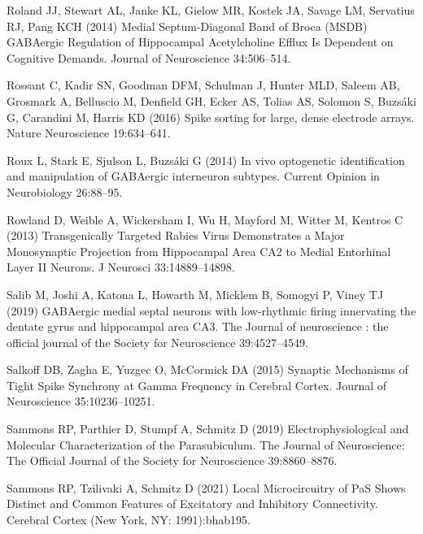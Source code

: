\documentclass[
  12pt,
  a4paper,
  openany]{book}
\newlength{\cslhangindent}
\newlength{\cslentryspacingunit} %
\newenvironment{CSLReferences}[2] %
 {%
  \setlength{\parindent}{0pt}
  \ifodd #1
  \let\oldpar\par
  \def\par{\hangindent=\cslhangindent\oldpar}
  \fi
  \setlength{\parskip}{#2\cslentryspacingunit}
 }%
 {}
\begin{document}
\begin{CSLReferences}{1}{0}
\leavevmode{}%
Roland JJ, Stewart AL, Janke KL, Gielow MR, Kostek JA, Savage LM, Servatius RJ, Pang KCH (2014) Medial {Septum}-{Diagonal} {Band} of {Broca} ({MSDB}) {GABAergic} {Regulation} of {Hippocampal} {Acetylcholine} {Efflux} {Is} {Dependent} on {Cognitive} {Demands}. Journal of Neuroscience 34:506--514.

\leavevmode{}%
Rossant C, Kadir SN, Goodman DFM, Schulman J, Hunter MLD, Saleem AB, Grosmark A, Belluscio M, Denfield GH, Ecker AS, Tolias AS, Solomon S, Buzsáki G, Carandini M, Harris KD (2016) Spike sorting for large, dense electrode arrays. Nature Neuroscience 19:634--641.

\leavevmode{}%
Roux L, Stark E, Sjulson L, Buzsáki G (2014) In vivo optogenetic identification and manipulation of {GABAergic} interneuron subtypes. Current Opinion in Neurobiology 26:88--95.

\leavevmode{}%
Rowland D, Weible A, Wickersham I, Wu H, Mayford M, Witter M, Kentros C (2013) Transgenically {Targeted} {Rabies} {Virus} {Demonstrates} a {Major} {Monosynaptic} {Projection} from {Hippocampal} {Area} {CA2} to {Medial} {Entorhinal} {Layer} {II} {Neurons}. J Neurosci 33:14889--14898.

\leavevmode{}%
Salib M, Joshi A, Katona L, Howarth M, Micklem B, Somogyi P, Viney TJ (2019) {GABAergic} medial septal neurons with low-rhythmic firing innervating the dentate gyrus and hippocampal area {CA3}. The Journal of neuroscience : the official journal of the Society for Neuroscience 39:4527--4549.

\leavevmode{}%
Salkoff DB, Zagha E, Yuzgec O, McCormick DA (2015) Synaptic {Mechanisms} of {Tight} {Spike} {Synchrony} at {Gamma} {Frequency} in {Cerebral} {Cortex}. Journal of Neuroscience 35:10236--10251.

\leavevmode{}%
Sammons RP, Parthier D, Stumpf A, Schmitz D (2019) Electrophysiological and {Molecular} {Characterization} of the {Parasubiculum}. The Journal of Neuroscience: The Official Journal of the Society for Neuroscience 39:8860--8876.

\leavevmode{}%
Sammons RP, Tzilivaki A, Schmitz D (2021) Local {Microcircuitry} of {PaS} {Shows} {Distinct} and {Common} {Features} of {Excitatory} and {Inhibitory} {Connectivity}. Cerebral Cortex (New York, NY: 1991):bhab195.


\end{CSLReferences}
\end{document}
